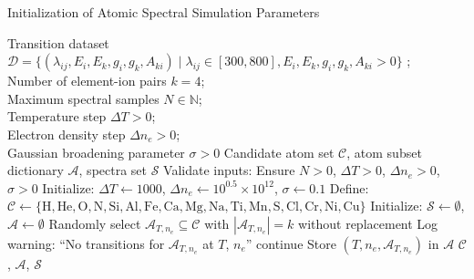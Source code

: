 \begin{algorithm}
\small
\caption{Initialization of Atomic Spectral Simulation Parameters}
\begin{algorithmic}[1]
  \REQUIRE
    Transition dataset $\mathcal{D} = \{ (\lambda_{ij}, E_i, E_k, g_i, g_k, A_{ki}) \mid \lambda_{ij} \in [300, 800], E_i, E_k, g_i, g_k, A_{ki} > 0 \}$ \cite{Kramida2023}; \\
    Number of element-ion pairs $k = 4$; \\
    Maximum spectral samples $N \in \mathbb{N}$; \\
    Temperature step $\Delta T > 0$; \\
    Electron density step $\Delta n_e > 0$; \\
    Gaussian broadening parameter $\sigma > 0$
  \ENSURE
    Candidate atom set $\mathcal{C}$, atom subset dictionary $\mathcal{A}$, spectra set $\mathcal{S}$
  \STATE Validate inputs: Ensure $N > 0$, $\Delta T > 0$, $\Delta n_e > 0$, $\sigma > 0$
  \STATE Initialize: $\Delta T \gets 1000$, $\Delta n_e \gets 10^{0.5} \times 10^{12}$, $\sigma \gets 0.1$
  \STATE Define: $\mathcal{C} \gets \{\text{H}, \text{He}, \text{O}, \text{N}, \text{Si}, \text{Al}, \text{Fe}, \text{Ca}, \text{Mg}, \text{Na}, \text{Ti}, \text{Mn}, \text{S}, \text{Cl}, \text{Cr}, \text{Ni}, \text{Cu}\}$
  \STATE Initialize: $\mathcal{S} \gets \emptyset$, $\mathcal{A} \gets \emptyset$
      \STATE Randomly select $\mathcal{A}_{T,n_e} \subseteq \mathcal{C}$ with $|\mathcal{A}_{T,n_e}| = k$ without replacement
        \STATE Log warning: ``No transitions for $\mathcal{A}_{T,n_e}$ at $T$, $n_e$'' 
        \STATE continue
      \ENDIF
      \STATE Store $(T, n_e, \mathcal{A}_{T,n_e})$ in $\mathcal{A}$
    \ENDFOR
  \ENDFOR
  \STATE \RETURN $\mathcal{C}$, $\mathcal{A}$, $\mathcal{S}$
\end{algorithmic}
\end{algorithm}

